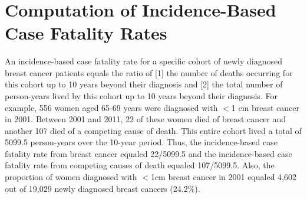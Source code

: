 \documentclass[11pt,letterpaper]{article}
\theoremstyle{plain}
\begin{document}

\blind \title{\bf \tit} \maketitle \fi


\thispagestyle{empty}
\setcounter{page}{0}



\newpage
\clearpage
 \setcounter{table}{0}  %
 \setcounter{figure}{0}  %
 \setcounter{page}{1}
 \renewcommand{\figurename}{Supplemental Figure}
 \renewcommand{\tablename}{Supplemental Table}
\appendix

\section{Computation of Incidence-Based Case Fatality Rates}
An incidence-based case fatality rate for a specific cohort of newly
diagnosed breast cancer patients equals the ratio of [1] the number of
deaths occurring for this cohort up to 10 years beyond their diagnosis
and [2] the total number of person-years lived by this cohort up to 10
years beyond their diagnosis.  For example, 556 women aged 65-69 years
were diagnosed with $<$1 cm breast cancer in 2001.  Between 2001 and
2011, 22 of these women died of breast cancer and another 107 died of
a competing cause of death.  This entire cohort lived a total of
5099.5 person-years over the 10-year period.  Thus, the
incidence-based case fatality rate from breast cancer equaled
22/5099.5 and the incidence-based case fatality rate from competing
causes of death equaled 107/5099.5.  Also, the proportion of women
diagnosed with $<$1cm breast cancer in 2001 equaled 4,602 out of 19,029
newly diagnosed breast cancers (24.2\%).
\end{document}
